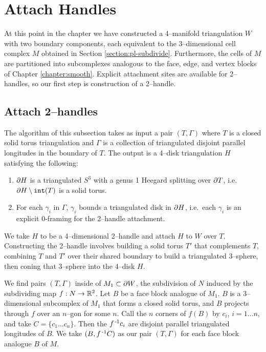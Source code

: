 \section{Attach Handles}
\label{section:pl-handle}

At this point in the chapter we have constructed a 4--manifold triangulation $W$ with two boundary components, each equivalent to the 3--dimensional cell complex $M$ obtained in Section \ref{section:pl-subdivide}.
Furthermore, the cells of $M$ are partitioned into subcomplexes analogous to the face, edge, and vertex blocks of Chapter \ref{chapter:smooth}.
Explicit attachment sites are available for 2--handles, so our first step is construction of a 2--handle.

\subsection{Attach 2--handles}
\label{section:pl-2-handle}

The algorithm of this subsection takes as input a pair $(T,\Gamma)$ where $T$ is a closed solid torus triangulation and $\Gamma$ is a collection of triangulated disjoint parallel longitudes in the boundary of $T$.
The output is a 4--disk triangulation $H$ satisfying the following:
\begin{enumerate}
	\item $\partial H$ is a triangulated $S^3$ with a genus 1 Heegard splitting over $\partial T$, i.e.\ $\partial H\setminus \texttt{int}(T)$ is a solid torus.
	\item For each $\gamma_i$ in $\Gamma$, $\gamma_i$ bounds a triangulated disk in $\partial H$, i.e.\ each $\gamma_i$ is an explicit 0-framing for the 2--handle attachment.
\end{enumerate}
We take $H$ to be a 4--dimensional 2--handle and attach $H$ to $W$ over $T$.
Constructing the 2--handle involves building a solid torus $T'$ that complements $T$, combining $T$ and $T'$ over their shared boundary to build a triangulated 3--sphere, then coning that 3--sphere into the 4--disk $H$.

We find pairs $(T,\Gamma)$ inside of $M_1\subset\partial W$, the subdivision of $N$ induced by the subdividing map $f:N\to\mathbb{R}^2$.
Let $B$ be a face block analogue of $M_1$.
$B$ is a 3--dimensional subcomplex of $M_1$ that forms a closed solid torus,
and $B$ projects through $f$ over an $n$--gon for some $n$.
Call the $n$ corners of $f(B)$ by $c_i$, $i=1\dots n$, and take $C=\{c_1\dots c_n\}$.
Then the $f^{\,\text{-}1} c_i$ are disjoint parallel triangulated longitudes of $B$.
We take $(B, f^{\,\text{-}1} C)$ as our pair $(T,\Gamma)$ for each face block analogue $B$ of $M$.

